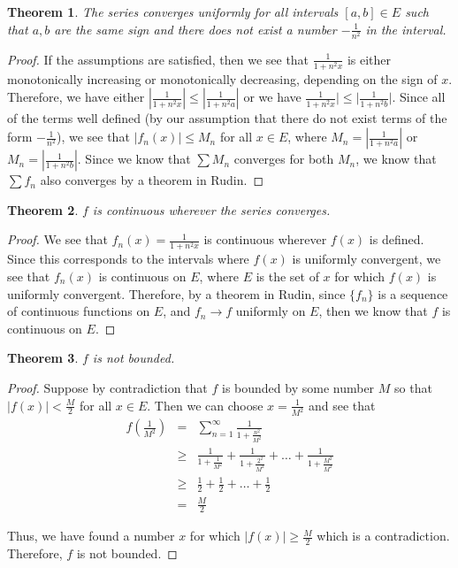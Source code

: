 \documentclass[psamsfonts]{amsart}
\newtheorem{thm}{Theorem}[section]
\theoremstyle{definition}
\theoremstyle{remark}
\numberwithin{equation}{section}
\begin{document}
\begin{thm}
The series converges uniformly for all intervals $[a,b] \in E$ such that $a,b$ are the same sign and there does not exist a number $-\frac{1}{n^2}$ in the interval.
\end{thm}

\begin{proof}
If the assumptions are satisfied, then we see that $\frac{1}{1+n^2 x}$ is either monotonically increasing or monotonically decreasing, depending on the sign of $x$. Therefore, we have either $|\frac{1}{1+n^2 x}|  \leq | \frac{1}{1+ n^2 a} |$ or we have $\frac{1}{1+n^2 x}| \leq |\frac{1}{1+n^2 b}|$. Since all of the terms well defined (by our assumption that there do not exist terms of the form $-\frac{1}{n^2}$), we see that $|f_n(x)| \leq M_n$ for all $x \in E$, where $M_n = | \frac{1}{1+ n^2 a} |$ or $M_n = | \frac{1}{1+ n^2 b} |$. Since we know that $\sum M_n$ converges for both $M_n$, we know that $\sum f_n$ also converges by a theorem in Rudin. 
\end{proof}

\begin{thm}
$f$ is continuous wherever the series converges.
\end{thm}

\begin{proof}
We see that $f_n(x) = \frac{1}{1+n^2 x}$ is continuous wherever $f(x)$ is defined. Since this corresponds to the intervals where $f(x)$ is uniformly convergent, we see that $f_n(x)$ is continuous on $E$, where $E$ is the set of $x$ for which $f(x)$ is uniformly convergent. Therefore, by a theorem in Rudin, since $\{ f_n \}$ is a sequence of continuous functions on $E$, and $f_n \to f$ uniformly on $E$, then we know that $f$ is continuous on $E$. 
\end{proof}

\begin{thm}
$f$ is not bounded. 
\end{thm}

\begin{proof}
Suppose by contradiction that $f$ is bounded by some number $M$ so that $|f(x)| < \frac{M}{2}$ for all $x \in E$. Then we can choose $x = \frac{1}{M^2}$ and see that 
\begin{eqnarray}
f\left(\frac{1}{M^2} \right) &=& \sum_{n=1}^\infty \frac{1}{1+\frac{n^2}{M^2}}\\
&\geq& \frac{1}{1+ \frac{1}{M^2}} + \frac{1}{1+\frac{2^2}{M^2}} + \ldots + \frac{1}{1 + \frac{M^2}{M^2}} \\
&\geq& \frac{1}{2} + \frac{1}{2} + \ldots + \frac{1}{2} \\
&=& \frac{M}{2} 
\end{eqnarray}

Thus, we have found a number $x$ for which $|f(x)| \geq \frac{M}{2}$ which is a contradiction. Therefore, $f$ is not bounded. 
\end{proof}
\end{document}

